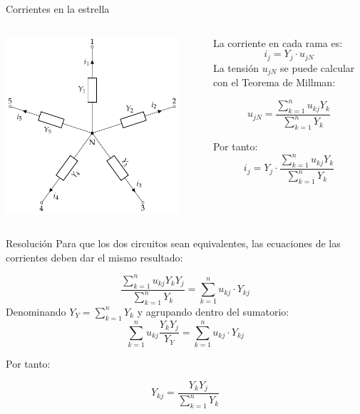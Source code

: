 \documentclass[aspectratio=169, usenames,svgnames,dvipsnames]{beamer}
\begin{document}
\begin{frame}[label={sec:orgdbc9bb6}]{Corrientes en la estrella}
\begin{columns}
\begin{column}{0.5\columnwidth}
\begin{center}
\includegraphics[width=0.9\textwidth]{../figs/Rosen_Y.pdf}
\end{center}
\end{column}

\begin{column}{0.5\columnwidth}
La corriente en cada rama es:
\[
  i_j = Y_j \cdot u_{jN}
\]
La tensión \(u_{jN}\) se puede calcular con el Teorema de Millman:

\[
  u_{jN} = \frac{\sum_{k = 1}^n u_{kj} Y_k}{\sum_{k  = 1}^n Y_k}
\]

Por tanto:
\[
  i_j = Y_j \cdot \frac{\sum_{k = 1}^n u_{kj} Y_k}{\sum_{k  = 1}^n Y_k}
\]
\end{column}
\end{columns}
\end{frame}

\begin{frame}[label={sec:orga509e30}]{Resolución}
Para que los dos circuitos sean equivalentes, las ecuaciones de las corrientes deben dar el mismo resultado:

\[
  \frac{\sum_{k = 1}^n u_{kj} Y_k Y_j}{\sum_{k  = 1}^n Y_k} = \sum_{k = 1}^n u_{kj} \cdot Y_{kj}  
\]
Denominando \(Y_Y = \sum_{k  = 1}^n Y_k\) y agrupando dentro del sumatorio:
\[
  \sum_{k = 1}^n u_{kj} \frac{Y_k Y_j}{Y_Y} = \sum_{k = 1}^n u_{kj} \cdot Y_{kj}  
\]

Por tanto:

\[
  \boxed{Y_{kj} = \frac{Y_k Y_j}{\sum_{k  = 1}^n Y_k}}
\]
\end{frame}
\end{document}
